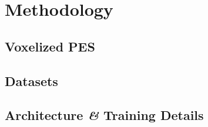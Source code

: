 \chapter{Methodology}

\section{Voxelized PES}

\section{Datasets}

\section{Architecture \textit{\&} Training Details}
